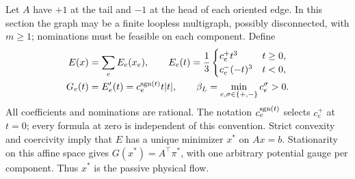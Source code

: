 Let $A$ have $+1$ at the tail and $-1$ at the head of each oriented
edge. In this section the graph may be a finite loopless multigraph,
possibly disconnected, with $m\ge1$; nominations must be feasible
on each component. Define
\begin{equation}
 \begin{split}
 E(x)&=\sum_e E_e(x_e),\qquad
 E_e(t)=\frac13
 \begin{cases}c_e^+t^3&t\ge0,\\c_e^-(-t)^3&t<0,\end{cases}\\
 G_e(t)&=E_e'(t)=c_e^{\operatorname{sgn}(t)}t|t|,\qquad
 \beta_L=\min_{e,\sigma\in\{+,-\}}c_e^\sigma>0.
 \end{split}
 \label{eq:a-cert-energy}
\end{equation}
All coefficients and nominations are rational. The notation
$c_e^{\operatorname{sgn}(t)}$ selects $c_e^+$ at $t=0$; every formula at zero
is independent of this convention. Strict convexity and coercivity
imply that $E$ has a unique minimizer $x^*$ on $Ax=b$.
Stationarity on this affine space gives
$G(x^*)=A^\top\pi^*$, with one arbitrary potential gauge per component.
Thus $x^*$ is the passive physical flow.

